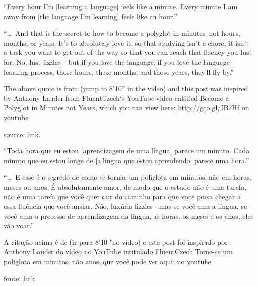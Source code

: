 \begin{multicols}{2}
{\footnotesize
``Every hour I’m [learning a language] feels like a minute. Every minute I am
away from [the language I'm learning] feels like an hour.''

``\dots\ And that is the secret to how to become a polyglot in minutes, not
hours, months, or years. It’s to absolutely love it, so that studying isn’t
a chore; it isn’t a task you want to get out of the way so that you can reach
that fluency you lust for. No, lust fizzles – but if you love the language, if
you love the language-learning process, those hours, those months, and those
years, they’ll fly by.''

\vspace{0.3\baselineskip}
\noindent
The above quote is from (jump to 8’10” in the video) and this post was inspired
by Anthony Lauder from FluentCzech‘s YouTube video entitled Become a Polyglot
in Minutes not Years, which you can view here: \href{http://goo.gl/IB7Hf}{http://goo.gl/IB7Hf} on youtube

\noindent
source: \href{http://mandarinfromscratch.com/2011/06/}{link.}}
\vfill \columnbreak

{\footnotesize
``Toda hora que eu estou [aprendizagem de uma língua] parece um minuto. Cada
minuto que eu estou longe de [a língua que estou aprendendo] parece uma hora.''

``\dots\  E esse é o segredo de como se tornar um poliglota em minutos, não em
horas, meses ou anos. É absolutamente amor, de modo que o estudo não é uma
tarefa, não é uma tarefa que você quer sair do caminho para que você possa
chegar a essa fluência que você ansiar. Não, luxúria fizzles - mas se você ama
a língua, se você ama o processo de aprendizagem da língua, as horas, os meses
e os anos, eles vão voar.''

\vspace{0.3\baselineskip}
\noindent
A citação acima é de (ir para 8'10 "no vídeo) e este post foi inspirado
por Anthony Lauder do vídeo no YouTube intitulado FluentCzech Torne-se um poliglota
em minutos, não anos, que você pode ver aqui: \href{http://goo.gl/IB7Hf}{no youtube}

\noindent
fonte: \href{http://mandarinfromscratch.com/2011/06/}{link}}
\end{multicols}
